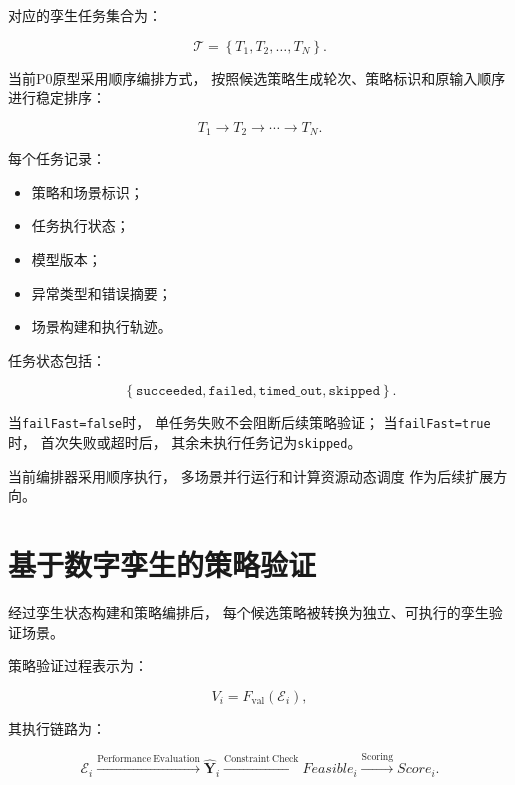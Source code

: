 \documentclass[lang=cn,12pt]{elegantbook}
\begin{document}
对应的孪生任务集合为：

\begin{equation}
\mathcal{T}
=
\left\{
T_1,
T_2,
\ldots,
T_N
\right\}.
\end{equation}

当前P0原型采用顺序编排方式，
按照候选策略生成轮次、策略标识和原输入顺序
进行稳定排序：

\begin{equation}
T_1
\rightarrow
T_2
\rightarrow
\cdots
\rightarrow
T_N.
\label{eq:sequential_twin_orchestration}
\end{equation}

每个任务记录：

\begin{itemize}
    \item 策略和场景标识；
    \item 任务执行状态；
    \item 模型版本；
    \item 异常类型和错误摘要；
    \item 场景构建和执行轨迹。
\end{itemize}

任务状态包括：

\begin{equation}
\left\{
\texttt{succeeded},
\texttt{failed},
\texttt{timed\_out},
\texttt{skipped}
\right\}.
\end{equation}

当\texttt{failFast=false}时，
单任务失败不会阻断后续策略验证；
当\texttt{failFast=true}时，
首次失败或超时后，
其余未执行任务记为\texttt{skipped}。

当前编排器采用顺序执行，
多场景并行运行和计算资源动态调度
作为后续扩展方向。


\section{基于数字孪生的策略验证}
\label{sec:twin_based_policy_validation}

经过孪生状态构建和策略编排后，
每个候选策略被转换为独立、可执行的孪生验证场景。

策略验证过程表示为：

\begin{equation}
V_i
=
F_{\mathrm{val}}
\left(
\mathcal{E}_i
\right),
\label{eq:twin_validation_function}
\end{equation}

其执行链路为：

\begin{equation}
\mathcal{E}_i
\xrightarrow{\mathrm{Performance\ Evaluation}}
\hat{\boldsymbol{Y}}_i
\xrightarrow{\mathrm{Constraint\ Check}}
Feasible_i
\xrightarrow{\mathrm{Scoring}}
Score_i.
\label{eq:twin_validation_process}
\end{equation}
\end{document}
